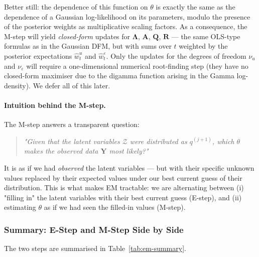 \documentclass[11pt, a4paper, oneside]{article}
\newcommand{\mY}{\mathbf{Y}}
\newcommand{\mL}{\boldsymbol{\Lambda}}
\newcommand{\mA}{\mathbf{A}}
\newcommand{\mR}{\mathbf{R}}
\newcommand{\mQ}{\mathbf{Q}}
\begin{document}
Better still: the dependence of this function on $\theta$ is exactly the
same as the dependence of a Gaussian log-likelihood on its parameters,
modulo the presence of the posterior weights as multiplicative
scaling factors. As a consequence, the M-step will yield
\emph{closed-form} updates for $\mL$, $\mA$, $\mQ$, $\mR$ — the same
OLS-type formulas as in the Gaussian DFM, but with sums over $t$
weighted by the posterior expectations $\hat{w}^u_t$ and
$\hat{w}^\varepsilon_t$. Only the updates for the degrees of freedom
$\nu_u$ and $\nu_\varepsilon$ will require a one-dimensional numerical
root-finding step (they have no closed-form maximiser due to the digamma
function arising in the Gamma log-density). We defer all of this later.

\paragraph{Intuition behind the M-step.}
The M-step answers a transparent question:

\begin{quote}
\emph{"Given that the latent variables $\mathcal{Z}$ were distributed as
$q^{(j+1)}$, which $\theta$ makes the observed data $\mY$ most likely?"}
\end{quote}

It is as if we had \emph{observed} the latent variables — but with their
specific unknown values replaced by their expected values under our best
current guess of their distribution. This is what makes EM tractable:
we are alternating between (i) "filling in" the latent variables with
their best current guess (E-step), and (ii) estimating $\theta$ as if
we had seen the filled-in values (M-step).

\subsubsection{Summary: E-Step and M-Step Side by Side}

The two steps are summarised in Table~\ref{tab:em-summary}.
\end{document}
